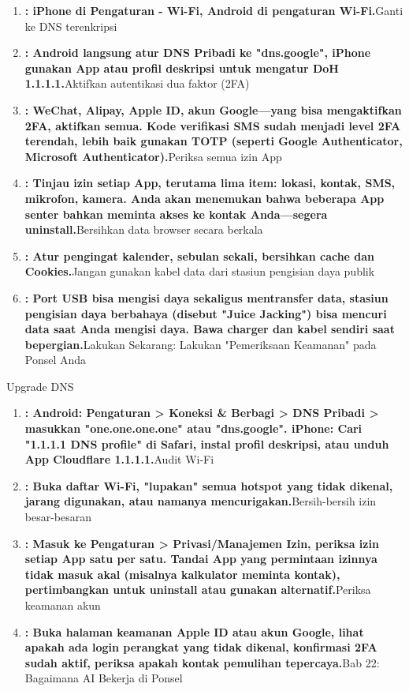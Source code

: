 \begin{enumerate}
  \item \textbf{: iPhone di Pengaturan - Wi-Fi, Android di pengaturan Wi-Fi.}Ganti ke DNS terenkripsi
  \item \textbf{: Android langsung atur DNS Pribadi ke "dns.google", iPhone gunakan App atau profil deskripsi untuk mengatur DoH 1.1.1.1.}Aktifkan autentikasi dua faktor (2FA)
  \item \textbf{: WeChat, Alipay, Apple ID, akun Google—yang bisa mengaktifkan 2FA, aktifkan semua. Kode verifikasi SMS sudah menjadi level 2FA terendah, lebih baik gunakan TOTP (seperti Google Authenticator, Microsoft Authenticator).}Periksa semua izin App
  \item \textbf{: Tinjau izin setiap App, terutama lima item: lokasi, kontak, SMS, mikrofon, kamera. Anda akan menemukan bahwa beberapa App senter bahkan meminta akses ke kontak Anda—segera uninstall.}Bersihkan data browser secara berkala
  \item \textbf{: Atur pengingat kalender, sebulan sekali, bersihkan cache dan Cookies.}Jangan gunakan kabel data dari stasiun pengisian daya publik
  \item \textbf{: Port USB bisa mengisi daya sekaligus mentransfer data, stasiun pengisian daya berbahaya (disebut "Juice Jacking") bisa mencuri data saat Anda mengisi daya. Bawa charger dan kabel sendiri saat bepergian.}Lakukan Sekarang: Lakukan "Pemeriksaan Keamanan" pada Ponsel Anda
\end{enumerate}

\begin{tcbpractice}{Upgrade DNS}
\begin{enumerate}
  \item \textbf{: Android: Pengaturan > Koneksi \& Berbagi > DNS Pribadi > masukkan "one.one.one.one" atau "dns.google". iPhone: Cari "1.1.1.1 DNS profile" di Safari, instal profil deskripsi, atau unduh App Cloudflare 1.1.1.1.}Audit Wi-Fi
  \item \textbf{: Buka daftar Wi-Fi, "lupakan" semua hotspot yang tidak dikenal, jarang digunakan, atau namanya mencurigakan.}Bersih-bersih izin besar-besaran
  \item \textbf{: Masuk ke Pengaturan > Privasi/Manajemen Izin, periksa izin setiap App satu per satu. Tandai App yang permintaan izinnya tidak masuk akal (misalnya kalkulator meminta kontak), pertimbangkan untuk uninstall atau gunakan alternatif.}Periksa keamanan akun
  \item \textbf{: Buka halaman keamanan Apple ID atau akun Google, lihat apakah ada login perangkat yang tidak dikenal, konfirmasi 2FA sudah aktif, periksa apakah kontak pemulihan tepercaya.}Bab 22: Bagaimana AI Bekerja di Ponsel
\end{enumerate}

\end{tcbpractice}
